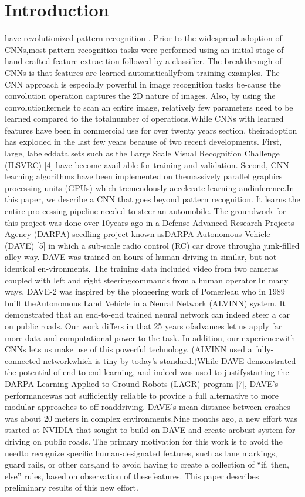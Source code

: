 \documentclass[a4paper]{IEEEtran}
\begin{document}
		\section{Introduction}
		have revolutionized pattern recognition \cite{Sh:1} .  Prior to the widespread adoption of CNNs,most pattern recognition tasks were performed using an initial stage of hand-crafted feature extrac-tion followed by a classifier.  The breakthrough of CNNs is that features are learned automaticallyfrom training examples.  The CNN approach is especially powerful in image recognition tasks be-cause the convolution operation captures the 2D nature of images.  Also, by using the convolutionkernels to scan an entire image, relatively few parameters need to be learned compared to the totalnumber of operations.While CNNs with learned features have been in commercial use for over twenty years section,  theiradoption has exploded in the last few years because of two recent developments. First, large, labeleddata sets such as the Large Scale Visual Recognition Challenge (ILSVRC) [4] have become avail-able for training and validation.  Second, CNN learning algorithms have been implemented on themassively parallel graphics processing units (GPUs) which tremendously accelerate learning andinference.In this paper,  we describe a CNN that goes beyond pattern recognition.   It learns the entire pro-cessing pipeline needed to steer an automobile.  The groundwork for this project was done over 10years ago in a Defense Advanced Research Projects Agency (DARPA) seedling project known asDARPA Autonomous Vehicle (DAVE) [5] in which a sub-scale radio control (RC) car drove througha junk-filled alley way. DAVE was trained on hours of human driving in similar, but not identical en-vironments. The training data included video from two cameras coupled with left and right steeringcommands from a human operator.In many ways, DAVE-2 was inspired by the pioneering work of Pomerleau \cite{Sh:2} who in 1989 built theAutonomous Land Vehicle in a Neural Network (ALVINN) system. It demonstrated that an end-to-end trained neural network can indeed steer a car on public roads. Our work differs in that 25 years ofadvances let us apply far more data and computational power to the task. In addition, our experiencewith CNNs lets us make use of this powerful technology. (ALVINN used a fully-connected networkwhich is tiny by today’s standard.)While  DAVE  demonstrated  the  potential  of  end-to-end  learning,  and  indeed  was  used  to  justifystarting the DARPA Learning Applied to Ground Robots (LAGR) program [7], DAVE’s performancewas not sufficiently reliable to provide a full alternative to more modular approaches to off-roaddriving. DAVE’s mean distance between crashes was about 20 meters in complex environments.Nine months ago, a new effort was started at NVIDIA that sought to build on DAVE and create arobust system for driving on public roads. The primary motivation for this work is to avoid the needto recognize specific human-designated features, such as lane markings, guard rails, or other cars,and to avoid having to create a collection of “if, then, else” rules, based on observation of thesefeatures. This paper describes preliminary results of this new effort.
\end{document}
